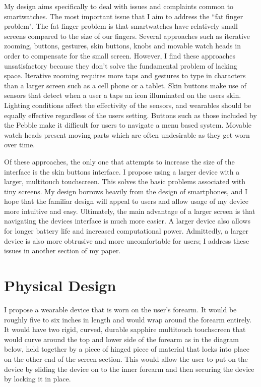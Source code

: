 \documentclass[11pt]{article}
\begin{document}
My design aims specifically to deal with issues and complaints common to smartwatches. The most important issue that I aim to address the ``fat finger problem". The fat finger problem is that smartwatches have relatively small screens compared to the size of our fingers. Several approaches such as iterative zooming, buttons, gestures, skin buttons, knobs and movable watch heads in order to compensate for the small screen. However, I find these approaches unsatisfactory because they don't solve the fundamental problem of lacking space. Iterative zooming requires more taps and gestures to type in characters than a larger screen such as a cell phone or a tablet. Skin buttons make use of sensors that detect when a user a taps an icon illuminated on the users skin. Lighting conditions affect the effectivity of the sensors, and wearables should be equally effective regardless of the users setting. Buttons such as those included by the Pebble make it difficult for users to navigate a menu based system. Movable watch heads present moving parts which are often undesirable as they get worn over time. 

Of these approaches, the only one that attempts to increase the size of the interface is the skin buttons interface. I propose using a larger device with a larger, multitouch touchscreen. This solves the basic problems associated with tiny screens. My design borrows heavily from the design of smartphones, and I hope that the familiar design will appeal to users and allow usage of my device more intuitive and easy. Ultimately, the main advantage of a larger screen is that navigating the devices interface is much more easier. A larger device also allows for longer battery life and increased computational power. Admittedly, a larger device is also more obtrusive and more uncomfortable for users; I address these issues in another section of my paper.

\section{Physical Design}
I propose a wearable device that is worn on the user's forearm. It would be roughly five to six inches in length and would wrap around the forearm entirely. It would have two rigid, curved, durable sapphire multitouch touchscreen that would curve around the top and lower side of the forearm as in the diagram below, held together by a piece of hinged piece of material that locks into place on the other end of the screen section. This would allow the user to put on the device by sliding the device on to the inner forearm and then securing the device by locking it in place. 
\end{document}
